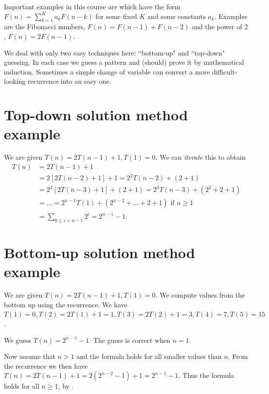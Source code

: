 Important examples  in this course are  which have the form 
$F(n) = \sum_{k=1}^K a_k F(n - k)$ for some fixed $K$ and some constants $a_k$. 
Examples are the Fibonacci numbers, $F(n) = F(n-1) + F(n-2)$ and the power of $2$, $F(n) = 2F(n-1)$.

We deal with only two easy techniques here: ``bottom-up" and ``top-down" guessing. 
In each case we guess a pattern and (should) prove it by mathematical induction. 
Sometimes a simple change of variable can convert a more difficult-looking recurrence into an easy one. 


\section{Top-down solution method example}
\begin{Boxample}
We are given $T(n) = 2 T(n - 1) + 1, T(1) = 0$. We can \emph{iterate} this to obtain 
\begin{align*}
T(n) & = 2 T(n - 1) + 1  \\
& = 2 [2 T(n - 2) + 1] + 1 = 2^2 T(n-2) + (2 + 1) \\
& = 2^2 [2T(n - 3) + 1] + (2 + 1) = 2^3 T(n - 3) + (2^2 + 2+ 1)  \\ 
& = \dots = 2^{n-1} T(1) + (2^{n-2} + \dots + 2 + 1)  \text{ if $n \geq 1$} \\
& = \sum_{0\leq i < n-1} 2^i = 2^{n-1} - 1.
\end{align*}
\end{Boxample}

\section{Bottom-up solution method example}
\begin{Boxample}
We are given $T(n) = 2 T(n - 1) + 1, T(1) = 0$. We compute values from the
 bottom up using the recurrence. We have $T(1) = 0, T(2) = 2T(1) + 1 = 1, T(3) = 2T(2) + 1 = 3, T(4) = 7, 
T(5) = 15$. 

We guess $T(n) = 2^{n-1} - 1$. The guess is correct when $n = 1$. 

Now assume that $n > 1$ and the formula holds 
for all smaller values than $n$. From the recurrence we then have 
$T(n) = 2T(n-1) + 1 = 2(2^{n-2} - 1) + 1 = 2^{n-1} - 1$. 
Thus the formula holds for all $n\geq 1$, by .
\end{Boxample}

